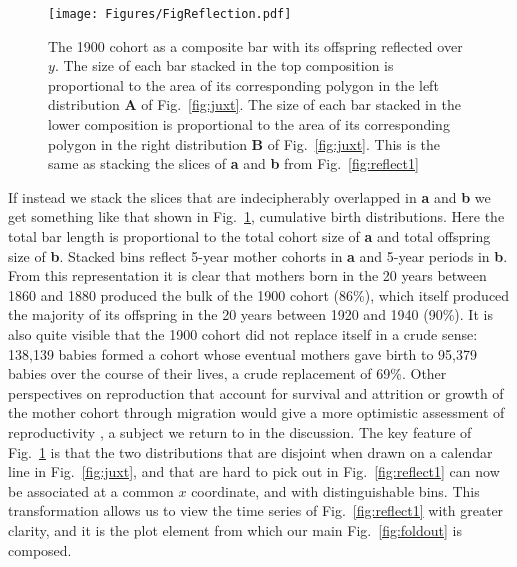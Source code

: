 \pagebreak
\begin{figure}
 \centering
        \texttt{[image: Figures/FigReflection.pdf]}
        \caption{The 1900 cohort as a composite bar with its offspring reflected over $y$. The size of each bar stacked in the top composition is proportional to the area of its corresponding polygon in the left distribution \textbf{A} of Fig.~\ref{fig:juxt}. The size of each bar stacked in the lower composition is proportional to the area of its corresponding polygon in the right distribution \textbf{B} of Fig.~\ref{fig:juxt}. This is the same as stacking the slices of \textbf{a} and \textbf{b} from Fig.~\ref{fig:reflect1} }
          \label{fig:refl}
\end{figure}
If instead we stack the slices that are indecipherably overlapped in \textbf{a} and \textbf{b} we get something like that shown in Fig.~\ref{fig:refl}, cumulative birth distributions. %
Here the total bar length is proportional to the total cohort size of \textbf{a} and total offspring size of \textbf{b}. Stacked bins reflect 5-year mother cohorts in \textbf{a} and 5-year periods in \textbf{b}. From this representation it is clear that mothers born in the 20 years between 1860 and 1880 produced the bulk of the 1900 cohort (86\%), which itself produced the majority of its offspring in the 20 years between 1920 and 1940 (90\%). It is also quite visible that the 1900 cohort did not replace itself in a crude sense: 138,139 babies formed a cohort whose eventual mothers gave birth to 95,379 babies over the course of their lives, a crude replacement of 69\%. Other perspectives on reproduction that account for survival and attrition or growth of the mother cohort through migration would give a more optimistic assessment of reproductivity \citep{henry1965reflexions}, a subject we return to in the discussion. The key feature of Fig.~\ref{fig:refl} is that the two distributions that are disjoint when drawn on a calendar line in Fig.~\ref{fig:juxt}, and that are hard to pick out in Fig.~\ref{fig:reflect1} can now be associated at a common $x$ coordinate, and with distinguishable bins. This transformation allows us to view the time series of Fig.~\ref{fig:reflect1} with greater clarity, and it is the plot element from which our main Fig.~\ref{fig:foldout} is composed. 

